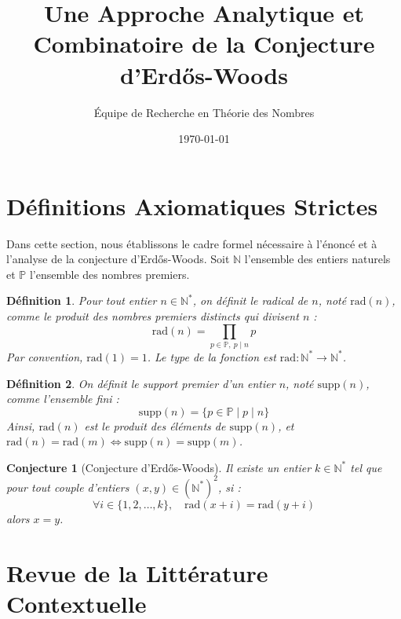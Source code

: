 \documentclass[12pt, a4paper]{article}
\title{Une Approche Analytique et Combinatoire de la Conjecture d'Erdős-Woods}
\author{Équipe de Recherche en Théorie des Nombres}
\date{\today}
\newtheorem{definition}{Définition}
\newtheorem{conjecture}{Conjecture}
\begin{document}
\maketitle
\tableofcontents
\newpage

\section{Définitions Axiomatiques Strictes}

Dans cette section, nous établissons le cadre formel nécessaire à l'énoncé et à l'analyse de la conjecture d'Erdős-Woods. Soit $\mathbb{N}$ l'ensemble des entiers naturels et $\mathbb{P}$ l'ensemble des nombres premiers.

\begin{definition}
Pour tout entier $n \in \mathbb{N}^*$, on définit le \textit{radical} de $n$, noté $\text{rad}(n)$, comme le produit des nombres premiers distincts qui divisent $n$ :
\begin{equation}
\text{rad}(n) = \prod_{p \in \mathbb{P}, \ p \mid n} p
\end{equation}
Par convention, $\text{rad}(1) = 1$. Le type de la fonction est $\text{rad} : \mathbb{N}^* \to \mathbb{N}^*$.
\end{definition}

\begin{definition}
On définit le support premier d'un entier $n$, noté $\text{supp}(n)$, comme l'ensemble fini :
\begin{equation}
\text{supp}(n) = \{ p \in \mathbb{P} \mid p \mid n \}
\end{equation}
Ainsi, $\text{rad}(n)$ est le produit des éléments de $\text{supp}(n)$, et $\text{rad}(n) = \text{rad}(m) \iff \text{supp}(n) = \text{supp}(m)$.
\end{definition}

\begin{conjecture}[Conjecture d'Erdős-Woods]
Il existe un entier $k \in \mathbb{N}^*$ tel que pour tout couple d'entiers $(x, y) \in (\mathbb{N}^*)^2$, si :
\begin{equation}
\forall i \in \{1, 2, \dots, k\}, \quad \text{rad}(x+i) = \text{rad}(y+i)
\end{equation}
alors $x = y$.
\end{conjecture}

\section{Revue de la Littérature Contextuelle}
\end{document}
